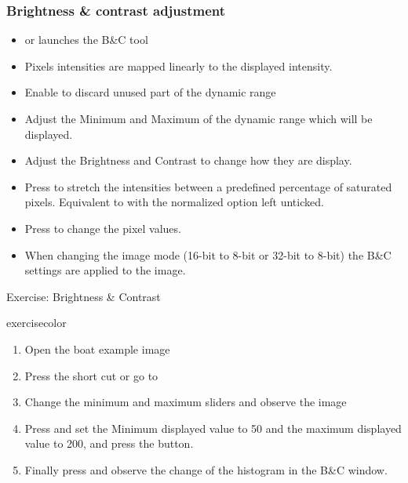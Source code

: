 \documentclass[ignorenonframetext,aspectratio=169,10pt,xcolor=table]{beamer}
\begin{document}
\begin{frame} \frametitle{Brightness \& contrast adjustment}

  \begin{itemize}\setlength\itemsep{1em}
    \item {} or
           launches the B\&C tool
    \item Pixels intensities are mapped linearly to the displayed
          intensity.
    \item Enable to discard unused part of the dynamic range
    \item Adjust the Minimum and Maximum of the dynamic range which will
          be displayed.
    \item Adjust the Brightness and Contrast to change how they are
          display.
    \item Press  to stretch the intensities between a
          predefined percentage of saturated pixels. Equivalent to  with the normalized option left unticked.
    \item Press  to change the pixel values.
    \item When changing the image mode (16-bit to 8-bit or 32-bit to
          8-bit) the B\&C settings are applied to the image.
  \end{itemize}

\end{frame}

\begin{frame}{Exercise: Brightness \& Contrast}
  \begin{beamercolorbox}[rounded=true, shadow=true, wd=\textwidth, sep=-1em]{exercisecolor}%
    \begin{enumerate}
      \item Open the boat example image 
      \item Press the short cut  or go to 
      \item Change the minimum and maximum sliders and observe the image
      \item Press  and set the Minimum displayed value to 50
            and the maximum displayed value to 200, and press the  button.
      \item Finally press  and observe the change of the
            histogram in the B\&C window.
    \end{enumerate}
  \end{beamercolorbox}
\end{frame}
\end{document}
